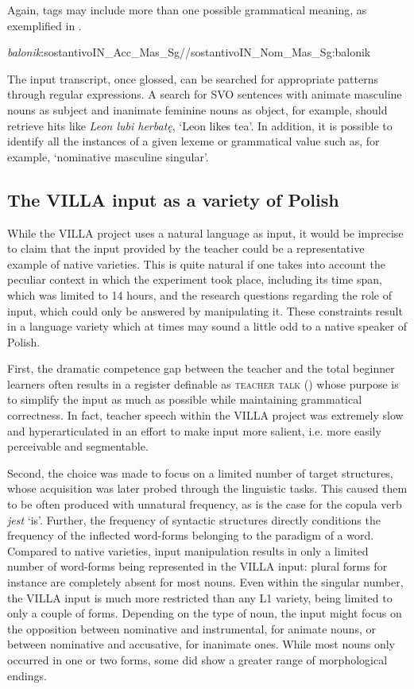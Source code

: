 Again, tags may include more than one possible grammatical meaning, as exemplified in .

\ea%
    \label{ex:02:1}
    \ttfamily\small
    \textit{balonik}:sostantivoIN\_Acc\_Mas\_Sg//sostantivoIN\_Nom\_Mas\_Sg:balonik
    \z

The input transcript, once glossed, can be searched for appropriate patterns through regular expressions. A search for SVO sentences with animate masculine nouns as subject and inanimate feminine nouns as object, for example, should retrieve hits like \textit{Leon lubi herbatę}, ‘Leon likes tea’. In addition, it is possible to identify all the instances of a given lexeme or grammatical value such as, for example, ‘nominative masculine singular’. 

\subsection{The VILLA input as a variety of Polish}\label{sec:02:1.3}

While the VILLA project uses a natural language as input, it would be imprecise to claim that the input provided by the teacher could be a representative example of native varieties. This is quite natural if one takes into account the peculiar context in which the experiment took place, including its time span, which was limited to 14 hours, and the research questions regarding the role of input, which could only be answered by manipulating it. These constraints result in a language variety which at times may sound a little odd to a native speaker of Polish. 

First, the dramatic competence gap between the teacher and the total beginner learners often results in a register definable as \textsc{teacher talk} (\citealt[134—144]{Larsen-FreemanLong1991}) whose purpose is to simplify the input as much as possible while maintaining grammatical correctness. In fact, teacher speech within the VILLA project was extremely slow and hyperarticulated in an effort to make input more salient, i.e. more easily perceivable and segmentable. 

Second, the choice was made to focus on a limited number of target structures, whose acquisition was later probed through the linguistic tasks. This caused them to be often produced with unnatural frequency, as is the case for the copula verb \textit{jest} ‘is’. Further, the frequency of syntactic structures directly conditions the frequency of the inflected word-forms belonging to the paradigm of a word. Compared to native varieties, input manipulation results in only a limited number of word-forms being represented in the VILLA input: plural forms for instance are completely absent for most nouns. Even within the singular number, the VILLA input is much more restricted than any L1 variety, being limited to only a couple of forms. Depending on the type of noun, the input might focus on the opposition between nominative and instrumental, for animate nouns, or between nominative and accusative, for inanimate ones. While most nouns only occurred in one or two forms, some did show a greater range of morphological endings. 

